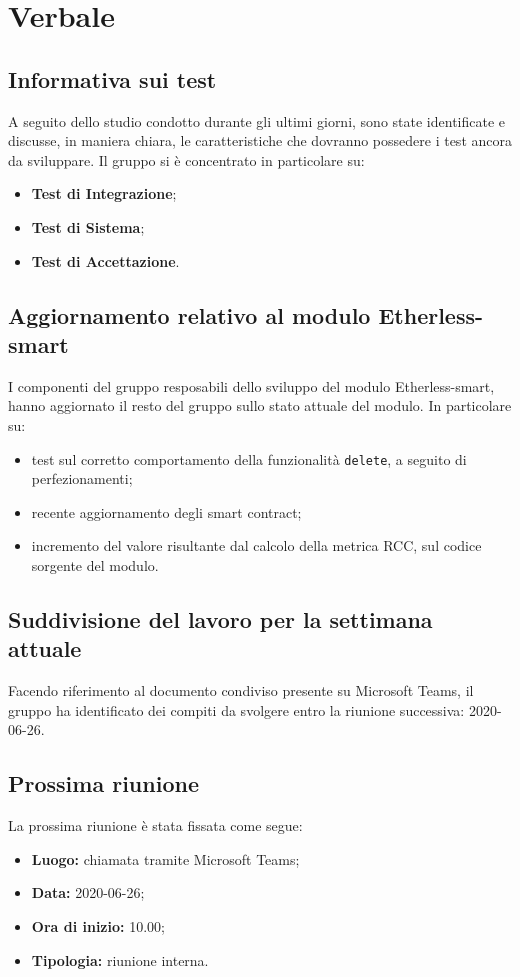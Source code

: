 \section{Verbale}
	\subsection{Informativa sui test}
		A seguito dello studio condotto durante gli ultimi giorni, sono state identificate e discusse, in maniera chiara, le caratteristiche che dovranno possedere i test ancora da sviluppare. Il gruppo si è concentrato in particolare su:
		\begin{itemize}
			\item \textbf{Test di Integrazione};
			\item \textbf{Test di Sistema};
			\item \textbf{Test di Accettazione}.
		\end{itemize}
		
	\subsection{Aggiornamento relativo al modulo Etherless-smart}
		I componenti del gruppo resposabili dello sviluppo del modulo Etherless-smart, hanno aggiornato il resto del gruppo sullo stato attuale del modulo. In particolare su:
		\begin{itemize}
			\item test sul corretto comportamento della funzionalità \texttt{delete}, a seguito di perfezionamenti;
			\item recente aggiornamento degli smart contract;
			\item incremento del valore risultante dal calcolo della metrica RCC, sul codice sorgente del modulo.
		\end{itemize}
		
	\subsection{Suddivisione del lavoro per la settimana attuale}
		Facendo riferimento al documento condiviso presente su Microsoft Teams, il gruppo ha identificato dei compiti da svolgere entro la riunione successiva: 2020-06-26.
				
	\subsection{Prossima riunione}
		La prossima riunione è stata fissata come segue:
		\begin{itemize}
			\item \textbf{Luogo:} chiamata tramite Microsoft Teams; 
			\item \textbf{Data:} 2020-06-26;
			\item \textbf{Ora di inizio:} 10.00;
			\item \textbf{Tipologia:} riunione interna.
		\end{itemize}